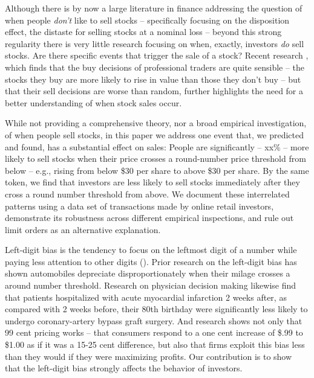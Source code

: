 Although there is by now a large literature in finance addressing the question of when people \textit{don't} like to sell stocks -- specifically focusing on the disposition effect, the distaste for selling stocks at a nominal loss -- beyond this strong regularity there is very little research focusing on when, exactly, investors \textit{do} sell stocks. Are there specific events that trigger the sale of a stock? 
Recent research \citep{akepanidtaworn2019selling}, which finds that the buy decisions of professional traders are quite sensible -- the stocks they buy are more likely to rise in value than those they don't buy -- but that their sell decisions are worse than random, further highlights the need for a better understanding of when stock sales occur. 

While not providing a comprehensive theory, nor a broad empirical investigation, of when people sell stocks, in this paper we address one event that, we predicted and found, has a substantial effect on sales: People are significantly -- xx\% -- more likely to sell stocks when their price crosses a round-number price threshold from below -- e.g., rising from below \$30 per share to above \$30 per share. By the same token, we find that investors are  less likely to sell stocks immediately after they cross a round number threshold from above.  We document these interrelated patterns using a data set of transactions made by online retail investors, demonstrate its robustness across different empirical inspections, and rule out limit orders as an alternative explanation. 

Left-digit bias is the tendency to focus on the leftmost digit of a number while paying less attention to other digits (\citealp{poltrock1984comparative}). Prior research on the left-digit bias has shown automobiles depreciate disproportionately when their milage crosses a around number threshold.  Research on physician decision making likewise find that patients hospitalized with acute myocardial infarction 2 weeks after, as compared with 2 weeks before, their 80th birthday were significantly less likely to undergo coronary-artery bypass graft surgery.  And research \citep{shlain2018more} shows not only that 99 cent pricing works -- that consumers respond to a one cent increase of \$.99 to \$1.00 as if it was a 15-25 cent difference, but also that firms exploit this bias less than they would if they were maximizing profits.  Our contribution is to show that the left-digit bias strongly affects the behavior of investors.


